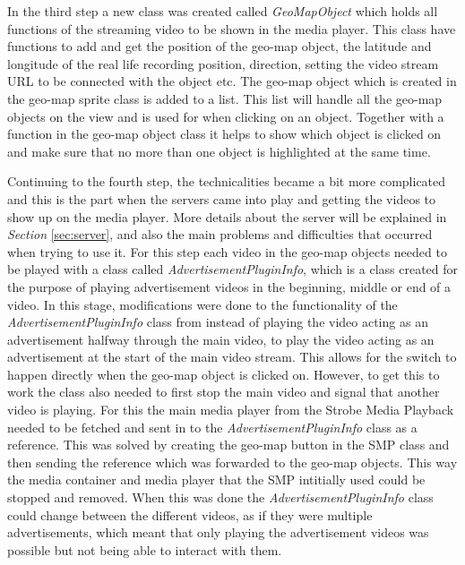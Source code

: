 In the third step a new class was created called \textit{GeoMapObject} which holds all functions of the streaming video to be shown in the media player. This class have functions to add and get the position of the geo-map object, the latitude and longitude of the real life recording position, direction, setting the video stream URL to be connected with the object etc. The geo-map object which is created in the geo-map sprite class is added to a list. This list will handle all the geo-map objects on the view and is used for when clicking on an object. Together with a function in the geo-map object class it helps to show which object is clicked on and make sure that no more than one object is highlighted at the same time.

Continuing to the fourth step, the technicalities became a bit more complicated and this is the part when the servers came into play and getting the videos to show up on the media player. More details about the server will be explained in \textit{Section} \ref{sec:server}, and also the main problems and difficulties that occurred when trying to use it. For this step each video in the geo-map objects needed to be played with a class called \textit{AdvertisementPluginInfo}, which is a class created for the purpose of playing advertisement videos in the beginning, middle or end of a video. In this stage, modifications were done to the functionality of the \textit{AdvertisementPluginInfo} class from instead of playing the video acting as an advertisement halfway through the main video, to play the video acting as an advertisement at the start of the main video stream. This allows for the switch to happen directly when the geo-map object is clicked on. However, to get this to work the class also needed to first stop the main video and signal that another video is playing. For this the main media player from the Strobe Media Playback needed to be fetched and sent in to the \textit{AdvertisementPluginInfo} class as a reference. This was solved by creating the geo-map button in the SMP class and then sending the reference which was forwarded to the geo-map objects. This way the media container and media player that the SMP intitially used could be stopped and removed. When this was done the \textit{AdvertisementPluginInfo} class could change between the different videos, as if they were multiple advertisements, which meant that only playing the advertisement videos was possible but not being able to interact with them. 

